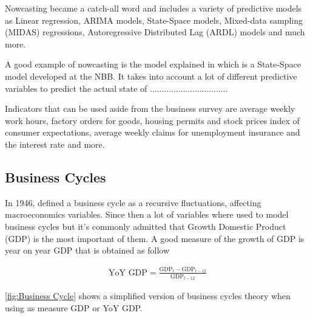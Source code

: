 \documentclass[12pt,a4paper,oneside]{book}
\begin{document}
Nowcasting became a catch-all word and includes a variety of predictive models as Linear regression, ARIMA models, State-Space models, Mixed-data sampling (MIDAS) regressions, Autoregressive Distributed Lag (ARDL) models  and much more.

A good example of nowcasting is the model explained in \cite{de_antonio_liedo_nowcasting_2014} which is a State-Space model developed at the NBB. It takes into account a lot of different predictive variables to predict the actual state of .................................

Indicators that can be used aside from the business survey are average weekly work hours, factory orders for goods, housing permits and stock prices index of consumer expectations, average weekly claims for unemployment insurance and the interest rate and more.


\subsection{Business Cycles}
\label{sec:Business Cycles}

In 1946, \citeauthor{mitchell_measuring_1946} defined a business cycle as a recursive fluctuations, affecting macroeconomics variables. Since then a lot of variables where used to model business cycles but it's commonly admitted that Growth Domestic Product (GDP) is the most important of them. 
A good measure of the growth of GDP is year on year GDP that is obtained as follow

\begin{eqnarray}
   \mbox{YoY GDP} = \frac{\mbox{GDP}_t - \mbox{GDP}_{t-12}}{\mbox{GDP}_{t-12}}      \label{eq:YoY GDP}
\end{eqnarray}


\autoref{fig:Business Cycle} shows a simplified version of business cycles theory when using as measure GDP or YoY GDP.
\end{document}
